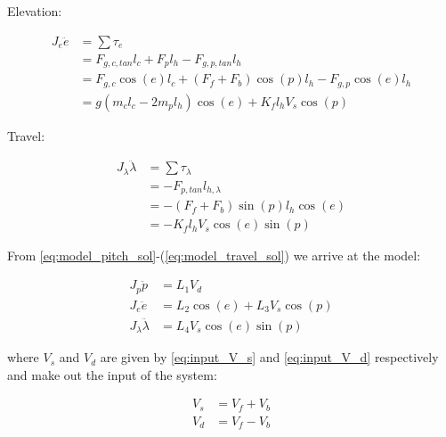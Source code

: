 Elevation:

\begin{subequations}\label{eq:model_elev_sol}
    \begin{aligned}
        J_{e} \ddot{e} &= \sum \tau_{e} \\
        &= F_{g,c,tan} l_{c} + F_{p} l_{h} - F_{g,p,tan} l_{h} \\
        &= F_{g,c} \cos(e) l_{c} + (F_{f} + F_{b}) \cos(p) l_{h} - F_{g,p} \cos(e) l_{h} \\
        &= g (m_{c} l_{c} - 2 m_{p} l_{h} ) \cos(e) + K_{f} l_{h} V_{s} \cos(p)
    \end{aligned}
\end{subequations}

Travel:

\begin{subequations}\label{eq:model_travel_sol}
    \begin{align}
        J_{\lambda} \ddot{\lambda} &= \sum \tau_{\lambda}  \\
        &= -F_{p,tan} l_{h,\lambda} \\
        &= -(F_{f} + F_b) \sin(p) l_{h} \cos(e) \\
        &= -K_{f} l_{h} V_{s} \cos(e) \sin(p)
    \end{align}
\end{subequations}

From \cref{eq:model_pitch_sol}-(\ref{eq:model_travel_sol}) we arrive at the model:

\begin{subequations}\label{eq:model}
    \begin{align}
        J_{p}\ddot{p} &= L_{1} V_{d}
        \label{eq:model_pitch} \\
        J_{e}\ddot{e} &= L_{2} \cos(e) + L_{3} V_{s} \cos(p)
        \label{eq:model_elev} \\
        J_{\lambda}\ddot{\lambda} &= L_{4} V_{s} \cos(e) \sin(p)
        \label{eq:model_travel}
    \end{align}
\end{subequations}

where \textit{$V_s$} and \textit{$V_d$} are given by \cref{eq:input_V_s} and \cref{eq:input_V_d}  respectively and make out the input of the system:

\begin{subequations}\label{eq:input}
    \begin{align}
        V_{s} &= V_{f} + V_{b} \label{eq:input_V_s} \\
        V_{d} &= V_{f} - V_{b} \label{eq:input_V_d}
    \end{align}
\end{subequations}

